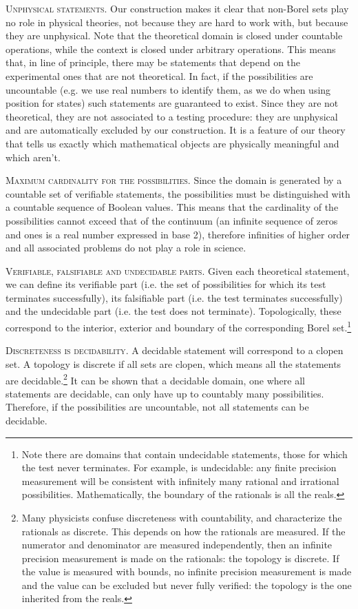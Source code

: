 \documentclass[10pt,twocolumn, nofootinbib]{revtex4-2}
\newcommand\partitle[1]{\textsc{#1}.}
\begin{document}
\partitle{Unphysical statements} Our construction makes it clear that non-Borel sets play no role in physical theories, not because they are hard to work with, but because they are unphysical. Note that the theoretical domain is closed under countable operations, while the context is closed under arbitrary operations. This means that, in line of principle, there may be statements that depend on the experimental ones that are not theoretical.  In fact, if the possibilities are uncountable (e.g. we use real numbers to identify them, as we do when using position for states) such statements are guaranteed to exist. Since they are not theoretical, they are not associated to a testing procedure: they are unphysical and are automatically excluded by our construction. It is a feature of our theory that tells us exactly which mathematical objects are physically meaningful and which aren't.

\partitle{Maximum cardinality for the possibilities} Since the domain is generated by a countable set of verifiable statements, the possibilities must be distinguished with a countable sequence of Boolean values. This means that the cardinality of the possibilities cannot exceed that of the continuum (an infinite sequence of zeros and ones is a real number expressed in base 2), therefore infinities of higher order and all associated problems do not play a role in science.

\partitle{Verifiable, falsifiable and undecidable parts} Given each theoretical statement, we can define its verifiable part (i.e. the set of possibilities for which its test terminates successfully), its falsifiable part (i.e. the test terminates successfully) and the undecidable part (i.e. the test does not terminate). Topologically, these correspond to the interior, exterior and boundary of the corresponding Borel set.\footnote{Note there are domains that contain undecidable statements, those for which the test never terminates. For example,  is undecidable: any finite precision measurement will be consistent with infinitely many rational and irrational possibilities. Mathematically, the boundary of the rationals is all the reals.}

\partitle{Discreteness is decidability} A decidable statement will correspond to a clopen set. A topology is discrete if all sets are clopen, which means all the statements are decidable.\footnote{Many physicists confuse discreteness with countability, and characterize the rationals as discrete. This depends on how the rationals are measured. If the numerator and denominator are measured independently, then an infinite precision measurement is made on the rationals: the topology is discrete. If the value is measured with bounds, no infinite precision measurement is made and the value can be excluded but never fully verified: the topology is the one inherited from the reals.} It can be shown that a decidable domain, one where all statements are decidable, can only have up to countably many possibilities. Therefore, if the possibilities are uncountable, not all statements can be decidable.
\end{document}
